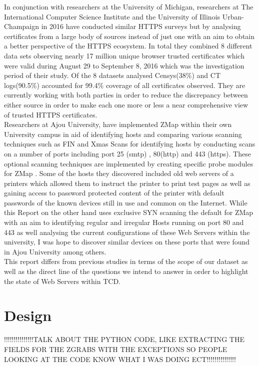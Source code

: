 \documentclass[a4wide,leqno,12pt]{report}
\begin{document}
In conjunction with researchers at the University of Michigan, researchers at The International Computer Science Institute and the University of Illinois Urban-Champaign in 2016 have conducted similar HTTPS surveys but by analysing certificates from a large body of sources instead of just one with an aim to obtain a better perspective of the HTTPS ecosystem. In total they combined 8 different data sets observing nearly 17 million unique browser trusted certificates which were valid during August 29 to September 8, 2016 which was the investigation period of their study. Of the 8 datasets analysed Censys(38\%) and CT logs(90.5\%) accounted for 99.4\% coverage of all certificates observed. They are currently working with both parties in order to reduce the discrepancy between either source in order to make each one more or less a near comprehensive view of trusted HTTPS certificates\cite{vandersloot2016towards}.\\

Researchers at Ajou University, have  implemented ZMap within their own University campus in aid of identifying hosts and comparing various scanning techniques such as FIN and Xmas Scans for identifying hosts by conducting scans on a number of ports including port 25 (smtp) , 80(http) and 443 (https). These optional scanning techniques are implemented by creating specific probe modules for ZMap \cite{lee2016implementation}. Some of the hosts they discovered included old web servers of a printers which allowed them to instruct the printer to print test pages as well as gaining access to  password protected content of the printer with default passwords of the known devices still in use and common on the Internet. While this Report on the other hand uses exclusive SYN scanning the default for ZMap with an aim to identifying regular and irregular Hosts running on port 80 and 443 as well analysing the current configurations of these Web Servers within the university, I was hope to discover similar devices on these ports that were found in Ajou University among others.\\ 

This report differs from previous studies in terms of the scope of our dataset as well as the direct line of the questions we intend to answer in order to highlight the state of Web Servers within TCD.

\chapter{Design}
!!!!!!!!!!!!!!!TALK ABOUT THE PYTHON CODE, LIKE EXTRACTING THE FIELDS FOR THE ZGRABS WITH THE EXCEPTIONS SO PEOPLE LOOKING AT THE CODE KNOW WHAT I WAS DOING ECT!!!!!!!!!!!!!!!\\
\end{document}
